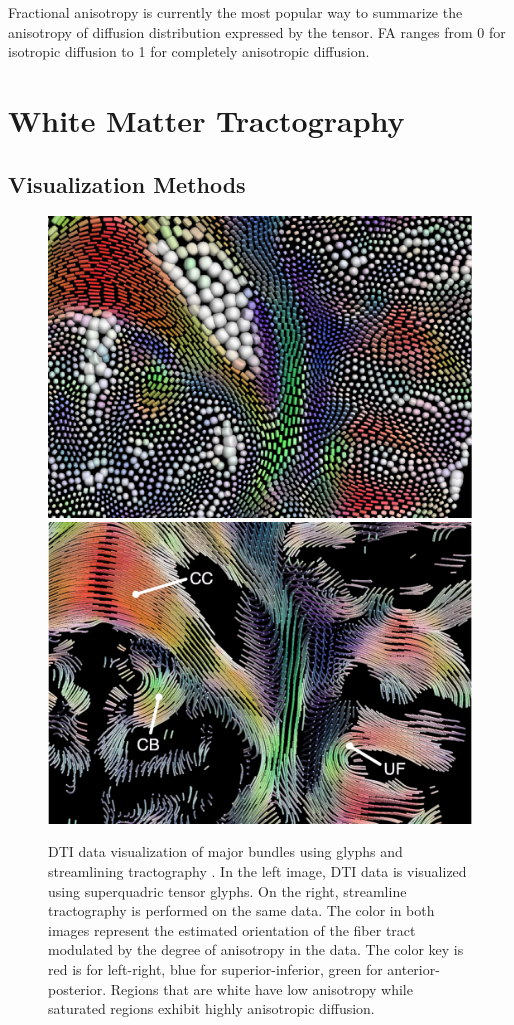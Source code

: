 Fractional anisotropy is currently the most popular way to summarize the anisotropy of diffusion distribution expressed by the tensor.  FA ranges from 0 for isotropic diffusion to 1 for completely anisotropic diffusion.


\section{White Matter Tractography}

\subsection{Visualization Methods}
\begin{figure} \label{fig:visualization}
	\includegraphics[width=0.5\linewidth]{packedglyphs}
	\includegraphics[width=0.5\linewidth]{tractography}
	\caption{DTI data visualization of major bundles using glyphs and streamlining tractography \cite{KindlmannTVCG2006}.  In the left image, DTI data is visualized using superquadric tensor glyphs. On the right, streamline tractography is performed on the same data.  The color in both images represent the estimated orientation of the fiber tract modulated by the degree of anisotropy in the data.  The color key is red is for left-right, blue for superior-inferior, green for anterior-posterior.  Regions that are white have low anisotropy while saturated regions exhibit highly anisotropic diffusion.}
\end{figure}


